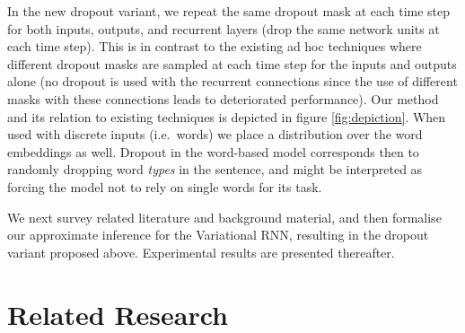 \documentclass{article}
\theoremstyle{definition}
\begin{document}
In the new dropout variant, we repeat the same dropout mask at each time step for both inputs, outputs, and recurrent layers (drop the same network units at each time step). This is in contrast to the existing ad hoc techniques where different dropout masks are sampled at each time step for the inputs and outputs alone (no dropout is used with the recurrent connections since the use of different masks with these connections leads to deteriorated performance).
Our method and its relation to existing techniques is depicted in figure \ref{fig:depiction}. 
When used with discrete inputs (i.e.\ words) we place a distribution over the word embeddings as well. Dropout in the word-based model corresponds then to randomly dropping word \textit{types} in the sentence, and might be interpreted as forcing the model not to rely on single words for its task.

We next survey related literature and background material, and then formalise our approximate inference for the Variational RNN, resulting in the dropout variant proposed above. Experimental results are presented thereafter.

\section{Related Research}
\end{document}
